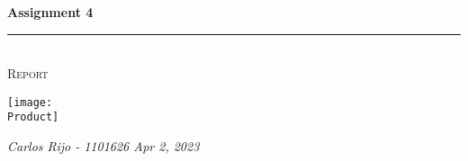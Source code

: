 \documentclass[a4paper,11pt,twoside]{article}
\newcommand{\HRule}{\rule{\linewidth}{0.3mm}}                       %
\newcommand{\Logo}{logo.jpg}
\newcommand{\Product}{cover.jpg}
\newcommand{\Title}{Assignment 4}
\newcommand{\Subtitle}{Report}
\newcommand{\DocumentDate}{Apr 2, 2023}
\begin{document}
\begin{titlepage}
    \textcolor{ceiiablue}{\textbf{\Huge \Title}}\\                  %
    \HRule \\[0.2cm]
    \textsc{\Large \Subtitle}                                       %
    \vfill
    \begin{center}
        \texttt{[image: \\Product]}
    \end{center}

    {\raggedleft\vfill\itshape{
        Carlos Rijo - 1101626
        \newline
        \DocumentDate}
    }
\end{titlepage}

\clearpage

\tableofcontents
\newpage




%

\clearpage
% 
% 
\end{document}
